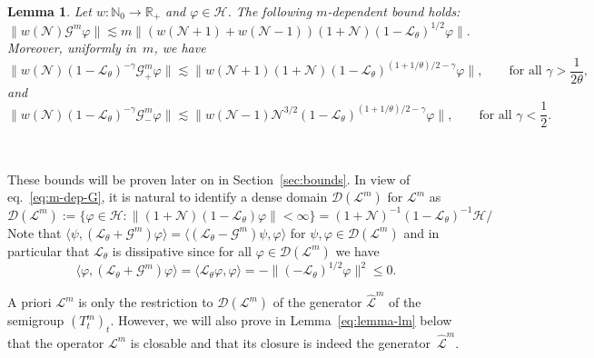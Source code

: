 \documentclass{article}
\newcommand{\assign}{:=}
\newtheorem{lemma}{Lemma}
\begin{document}
\begin{lemma}
  \label{lem:uniform-bds-G}Let $w : \mathbb{N}_0 \rightarrow \mathbb{R}_+$ and
  $\varphi \in \mathcal{H}$. The following $m$-dependent bound holds:
  \begin{equation}
    \| w (\mathcal{N}) \mathcal{G}^m \varphi \| \lesssim m \| (w (\mathcal{N}+
    1) + w (\mathcal{N}- 1)) (1 +\mathcal{N}) (1 -\mathcal{L}_{\theta})^{1 /
    2} \varphi \| . \label{eq:m-dep-G}
  \end{equation}
  Moreover, uniformly in~$m$, we have
  \begin{equation}
    \| w (\mathcal{N}) (1 -\mathcal{L}_{\theta})^{- \gamma} \mathcal{G}_+^m
    \varphi \| \lesssim \| w (\mathcal{N}+ 1) (1 +\mathcal{N}) (1
    -\mathcal{L}_{\theta})^{(1 + 1 / \theta) / 2 - \gamma} \varphi \|, \qquad
    \text{for all } \gamma > \frac{1}{2 \theta}, \label{eq:unifbdG1}
  \end{equation}
  and
  \begin{equation}
    \| w (\mathcal{N}) (1 -\mathcal{L}_{\theta})^{- \gamma} \mathcal{G}_-^m
    \varphi \| \lesssim \| w (\mathcal{N}- 1) \mathcal{N}^{3 / 2} (1
    -\mathcal{L}_{\theta})^{(1 + 1 / \theta) / 2 - \gamma} \varphi \|, \qquad
    \text{for all } \gamma < \frac{1}{2} . \label{eq:unifbdG2}
  \end{equation}
\end{lemma}

\

These bounds will be proven later on in Section~\ref{sec:bounds}. In view of
eq.~{\eqref{eq:m-dep-G}}, it is natural to identify a dense domain
$\mathcal{D} (\mathcal{L}^m)$ for $\mathcal{L}^m$ as
\[ \mathcal{D} (\mathcal{L}^m) \assign \{ \varphi \in \mathcal{H}: \| (1
   +\mathcal{N}) (1 -\mathcal{L}_{\theta}) \varphi \| < \infty \} = (1
   +\mathcal{N})^{- 1} (1 -\mathcal{L}_{\theta})^{- 1} \mathcal{H}/ \]
Note that $\langle \psi, (\mathcal{L}_{\theta} +\mathcal{G}^m) \varphi \rangle
= \langle (\mathcal{L}_{\theta} -\mathcal{G}^m) \psi, \varphi \rangle$ for
$\psi, \varphi \in \mathcal{D} (\mathcal{L}^m)$ and in particular that
$\mathcal{L}_{\theta}$ is dissipative since for all $\varphi \in \mathcal{D}
(\mathcal{L}^m)$ we have
\[ \langle \varphi, (\mathcal{L}_{\theta} +\mathcal{G}^m) \varphi \rangle =
   \langle \mathcal{L}_{\theta} \varphi, \varphi \rangle = - \|
   (-\mathcal{L}_{\theta})^{1 / 2} \varphi \|^2 \leqslant 0. \]


A priori $\mathcal{L}^m$ is only the restriction to $\mathcal{D}
(\mathcal{L}^m)$ of the generator $\hat{\mathcal{L}}^m$ of the semigroup
$(T^m_t)_t$. However, we will also prove in Lemma~\ref{eq:lemma-lm} below that
the operator $\mathcal{L}^m$ is closable and that its closure is indeed the
generator~$\hat{\mathcal{L}}^m$.
\end{document}

